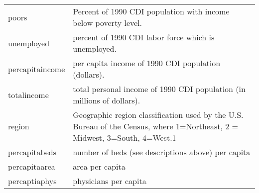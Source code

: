 \documentclass[]{article}
\begin{document}
\begin{longtable}[]{@{}ll@{}}
\begin{minipage}[t]{0.11\columnwidth}
poors\strut
\end{minipage} & \begin{minipage}[t]{0.84\columnwidth}\raggedright\strut
Percent of 1990 CDI population with income below poverty level.\strut
\end{minipage}\tabularnewline
\begin{minipage}[t]{0.11\columnwidth}\raggedright\strut
unemployed\strut
\end{minipage} & \begin{minipage}[t]{0.84\columnwidth}\raggedright\strut
percent of 1990 CDI labor force which is unemployed.\strut
\end{minipage}\tabularnewline
\begin{minipage}[t]{0.11\columnwidth}\raggedright\strut
percapitaincome\strut
\end{minipage} & \begin{minipage}[t]{0.84\columnwidth}\raggedright\strut
per capita income of 1990 CDI population (dollars).\strut
\end{minipage}\tabularnewline
\begin{minipage}[t]{0.11\columnwidth}\raggedright\strut
totalincome\strut
\end{minipage} & \begin{minipage}[t]{0.84\columnwidth}\raggedright\strut
total personal income of 1990 CDI population (in millions of
dollars).\strut
\end{minipage}\tabularnewline
\begin{minipage}[t]{0.11\columnwidth}\raggedright\strut
region\strut
\end{minipage} & \begin{minipage}[t]{0.84\columnwidth}\raggedright\strut
Geographic region classification used by the U.S. Bureau of the Census,
where 1=Northeast, 2 = Midwest, 3=South, 4=West.1\strut
\end{minipage}\tabularnewline
\begin{minipage}[t]{0.11\columnwidth}\raggedright\strut
percapitabeds\strut
\end{minipage} & \begin{minipage}[t]{0.84\columnwidth}\raggedright\strut
number of beds (see descriptions above) per capita\strut
\end{minipage}\tabularnewline
\begin{minipage}[t]{0.11\columnwidth}\raggedright\strut
percapitaarea\strut
\end{minipage} & \begin{minipage}[t]{0.84\columnwidth}\raggedright\strut
area per capita\strut
\end{minipage}\tabularnewline
\begin{minipage}[t]{0.11\columnwidth}\raggedright\strut
percaptiaphys\strut
\end{minipage} & \begin{minipage}[t]{0.84\columnwidth}\raggedright\strut
physicians per capita\strut
\end{minipage}\tabularnewline
\bottomrule
\end{longtable}
\end{document}
